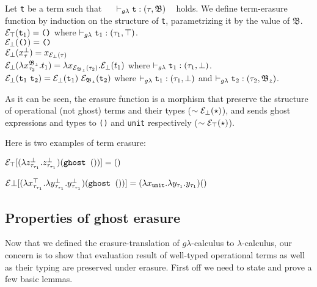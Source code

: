 \begin{dfn} 
\label{term-erasure}
Let \texttt{t} be a term such that 
~~ $\vdash_{g\lambda} \texttt{t} : (\tau, \mathfrak{B})$ ~ holds. 
We define term-erasure function by induction on 
the structure of \texttt{t}, parametrizing it by the value of 
$ \mathfrak{B}$. \\[0.1cm]
$ \mathcal{E}_{\top}(\texttt{t}_{1}) = \texttt{()}$ 
\quad where $ \vdash_{g\lambda} \texttt{t}_{1} : (\tau_{1}, \top)$.\\[0.05cm]
$\mathcal{E}_{\bot}(\texttt{()}) = \texttt{()}$\\[0.05cm]
$\mathcal{E}_{\bot}(x_{\tau}^{\bot}) = x_{\mathcal{E}_{\bot}(\tau)}$\\[0.05cm]  
$\mathcal{E}_{\bot}(\lambda x_{\tau_{2}}^{\mathfrak{B_{2}}}.t_{1}) 
= \lambda x_{\mathcal{E}_{\mathfrak{B_{2}}}(\tau_{2})}. \mathcal{E}_{\bot}(t_{1})$
\quad where $ \vdash_{g\lambda} \texttt{t}_{1} : (\tau_{1}, \bot)$.\\[0.05cm]
$\mathcal{E}_{\bot}(\texttt{t}_{1} ~ \texttt{t}_{2}) 
= \mathcal{E}_{\bot}(\texttt{t}_{1})  ~ \mathcal{E}_{\mathfrak{B_{2}}}(\texttt{t}_{2})$
\quad 
where $ \vdash_{g\lambda} \texttt{t}_{1} : (\tau_{1}, \bot)$
and $ \vdash_{g\lambda} \texttt{t}_{2} : (\tau_{2}, \mathfrak{B_{2}})$.
\end{dfn}
As it can be seen, the erasure function is a morphism that preserve
the structure of operational (not ghost) terms and their types ($\sim\mathcal{E}_{\bot}(\star)$), and sends ghost expressions and types to \texttt{()} and \texttt{unit} respectively ($\sim\mathcal{E}_{\top}(\star)$).

Here is two examples of term erasure:

$ 
\mathcal{E}_{\top}[
(\lambda z^{\bot}_{\tau_{\tau_{1}}}.z^{\bot}_{\tau_{\tau_{1}}})(\texttt{ghost }())] 
= () $

$
\mathcal{E}{\bot}[
(\lambda x^{\top}_{\tau_{\tau_{1}}}. 
\lambda y^{\bot}_{\tau_{\tau_{1}}}. y^{\bot}_{\tau_{\tau_{1}}}) 
(\texttt{ghost }())] = 
(\lambda x_{\texttt{unit}}. \lambda y_{\tau_{1}}.y_{\tau_{1}})() $ 




\subsection{Properties of ghost erasure}

\quad Now that we defined the erasure-translation of $g\lambda$-calculus to $\lambda$-calculus, our concern is to show that evaluation result of well-typed operational terms as well as their typing  are preserved under erasure. 
First off we need to state and prove a few basic lemmas. 





